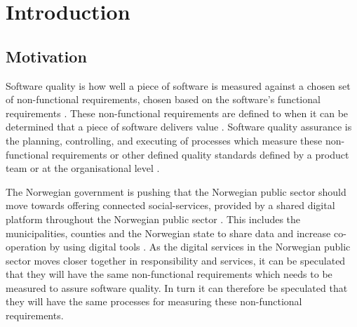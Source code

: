 \chapter{Introduction}

\section{Motivation} \label{sec:motivation}

Software quality is how well a piece of software is measured against a chosen set of non-functional requirements, chosen based on the software's functional requirements \cite{iso_25010:2011}. These non-functional requirements are defined to when it can be determined that a piece of software delivers value \cite{iso_25010:2011}. Software quality assurance is the planning, controlling, and executing of processes which measure these non-functional requirements or other defined quality standards defined by a product team or at the organisational level \cite{ieee_730_2014}\cite{sqa_wiki_2023}. 



The Norwegian government is pushing that the Norwegian public sector should move towards offering connected social-services, provided by a shared digital platform throughout the Norwegian public sector \cite{r_2019}. This includes the municipalities, counties and the Norwegian state to share data and increase co-operation by using digital tools \cite{r_2019}. As the digital services in the Norwegian public sector moves closer together in responsibility and services, it can be speculated that they will have the same non-functional requirements which needs to be measured to assure software quality. In turn it can therefore be speculated that they will have the same processes for measuring these non-functional requirements.

